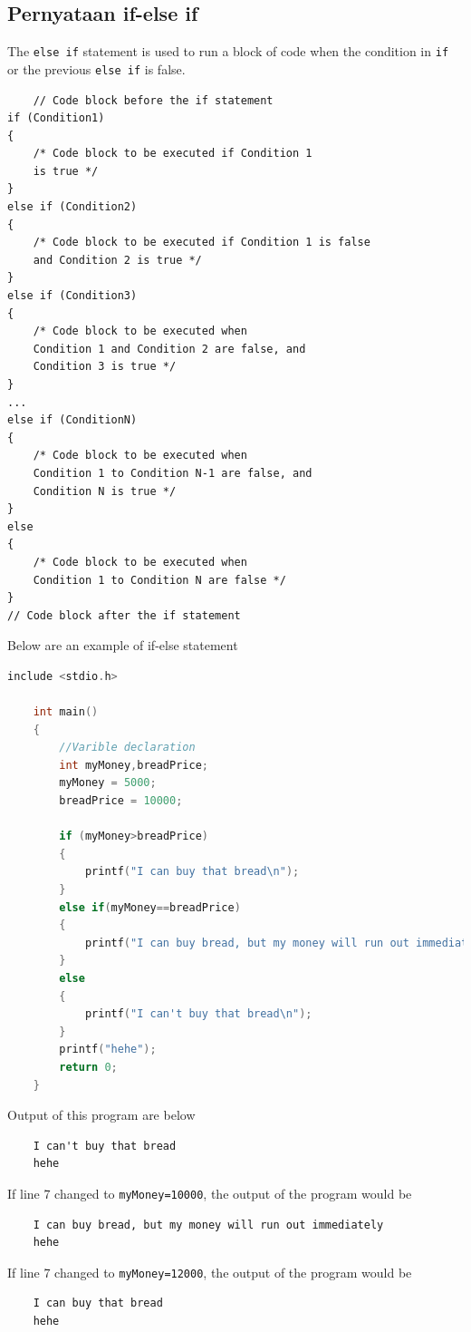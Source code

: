\subsection{Pernyataan if-else if}
The \verb|else if| statement is used to run a block of code when the condition in \verb|if| or the previous \verb|else if| is false.
\begin{verbatim}
	// Code block before the if statement
if (Condition1)
{
    /* Code block to be executed if Condition 1
    is true */
}
else if (Condition2)
{
    /* Code block to be executed if Condition 1 is false
    and Condition 2 is true */
}
else if (Condition3)
{
    /* Code block to be executed when
    Condition 1 and Condition 2 are false, and
    Condition 3 is true */
}
...
else if (ConditionN)
{
    /* Code block to be executed when
    Condition 1 to Condition N-1 are false, and
    Condition N is true */
}
else
{
    /* Code block to be executed when
    Condition 1 to Condition N are false */
}
// Code block after the if statement
\end{verbatim}
Below are an example of if-else statement
\begin{lstlisting}[language=c,caption = If-else example if,label=lst:ifelseifexample01]
	include <stdio.h>
	
	int main()
	{
		//Varible declaration
		int myMoney,breadPrice;
		myMoney = 5000;
		breadPrice = 10000;
		
		if (myMoney>breadPrice)
		{
		    printf("I can buy that bread\n");
		}
		else if(myMoney==breadPrice)
		{
		    printf("I can buy bread, but my money will run out immediately");
		}
		else
		{
	        printf("I can't buy that bread\n");	
		}
		printf("hehe");
		return 0;
	}
\end{lstlisting}
Output of this program are below
\begin{verbatim}
    I can't buy that bread
    hehe
\end{verbatim}
If line 7 changed to \verb|myMoney=10000|, the output of the program would be
\begin{verbatim}
    I can buy bread, but my money will run out immediately
    hehe
\end{verbatim}
If line 7 changed to \verb|myMoney=12000|, the output of the program would be
\begin{verbatim}
    I can buy that bread
    hehe
\end{verbatim}

